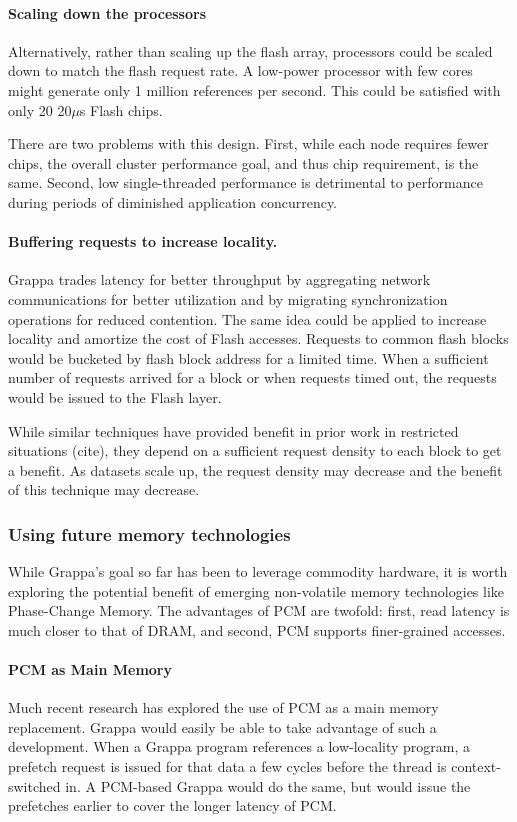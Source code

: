 \paragraph{Scaling down the processors}
Alternatively, rather than scaling up the flash array, processors
could be scaled down to match the flash request rate. A low-power
processor with few cores might generate only 1 million references per
second. This could be satisfied with only 20 20$\mu$s Flash chips.

There are two problems with this design. First, while each node
requires fewer chips, the overall cluster performance goal, and thus
chip requirement, is the same. Second, low single-threaded performance is detrimental to performance during periods of diminished application concurrency.

\paragraph{Buffering requests to increase locality.}
Grappa trades latency for better throughput by aggregating network
communications for better utilization and by migrating synchronization
operations for reduced contention. The same idea could be applied to
increase locality and amortize the cost of Flash accesses. Requests
to common flash blocks would be bucketed by flash block address for a
limited time. When a sufficient number of requests arrived for a block
or when requests timed out, the requests would be issued to the Flash
layer.

While similar techniques have provided benefit in prior work in
restricted situations (cite), they depend on a sufficient request
density to each block to get a benefit. As datasets scale up, the
request density may decrease and the benefit of this technique may
decrease.

\subsubsection{Using future memory technologies}

While Grappa's goal so far has been to leverage commodity hardware, it
is worth exploring the potential benefit of emerging non-volatile
memory technologies like Phase-Change Memory. The advantages of PCM
are twofold: first, read latency is much closer to that of DRAM, and
second, PCM supports finer-grained accesses.

\paragraph{PCM as Main Memory}
Much recent research has explored the use of PCM as a main memory
replacement. Grappa would easily be able to take advantage of such a
development. When a Grappa program references a low-locality program,
a prefetch request is issued for that data a few cycles before the
thread is context-switched in\cite{Nelson:hotpar2011}. A PCM-based
Grappa would do the same, but would issue the prefetches earlier to
cover the longer latency of PCM.

